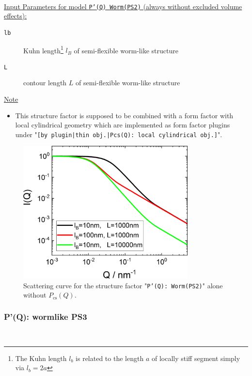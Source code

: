 \hspace{1pt}\\
\uline{Input Parameters for model \texttt{P'(Q) Worm(PS2)} (always without excluded volume effects):}\\
\begin{description}
\item[\texttt{lb}] Kuhn length\footnote{The Kuhn length $l_b$ is related to the length $a$ of
    locally stiff segment simply via $l_b=2a$} $l_B$ of semi-flexible worm-like structure
\item[\texttt{L}] contour length $L$ of semi-flexible worm-like structure
\end{description}

\noindent
\uline{Note}
\begin{itemize}
  \item This structure factor is supposed to be combined with a form factor with local cylindrical geometry which are implemented as form factor plugins
under "\texttt{[by plugin|thin obj.|Pcs(Q): local cylindrical obj.]}".
\end{itemize}

\begin{figure}[htb]
\begin{center}
\includegraphics[width=0.8\textwidth]{../images/form_factor/polymer_semiflexible/PprimeWormPS2.png}
\end{center}
\caption{Scattering curve for the structure factor "\texttt{P'(Q): Worm(PS2)}" alone without $P_\mathrm{cs}(Q)$.}
\label{fig_IQ:PprimeWormPS2}
\end{figure}

\clearpage
\subsubsection{P'(Q): wormlike PS3} ~\\
\label{plugin:Pprime4wormPS3}

